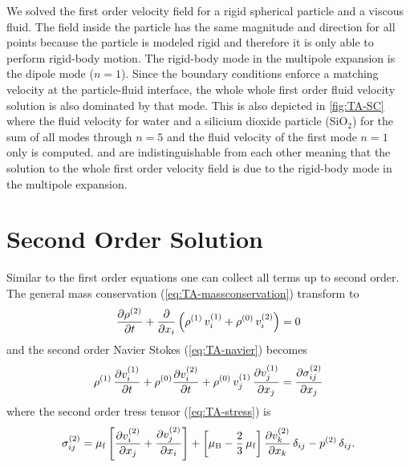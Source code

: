 We solved the first order velocity field for a rigid spherical particle and a 
viscous fluid. The field inside the particle has the same magnitude and 
direction for all points because the particle is modeled rigid and therefore it 
is only able to perform rigid-body motion. The rigid-body mode in the multipole 
expansion is the dipole mode ($n=1$). Since the boundary conditions enforce a 
matching velocity at the particle-fluid interface, the whole whole first order 
fluid velocity solution is also dominated by that mode. This is also depicted 
in \cref{fig:TA-SC} where the fluid velocity for water and a silicium dioxide 
particle (SiO$_{2}$) for the sum of all modes through $n=5$ and the fluid 
velocity of the first mode $n=1$ only is computed.  and 
 are indistinguishable from each other meaning that the 
solution to the whole first order velocity field is due to the rigid-body mode 
in the multipole expansion.

\section{Second Order Solution\label{sec:TA-secondorder}}

Similar to the first order equations one can collect all terms up to second 
order. The general mass conservation (\cref{eq:TA-massconservation}) transform 
to
\begin{equation}
  \pdv{  \rho^{(2)}  }{t} + \pdv{x_{i}}\left(\rho^{(1)}\,v_{i}^{(1)} 
  + \rho^{(0)}\,v_{i}^{(2)} \right) = 0
  \label{eq:TA-nd-massconservatio}
\end{equation}
and the second order Navier Stokes (\cref{eq:TA-navier}) becomes
\begin{equation}
  \rho^{(1)}\,\pdv{  v_{i}^{(1)}  }{t} + \rho^{(0)} 
  \pdv{  v_{i}^{(2)}  }{t} + 
  \rho^{(0)}\,v_{j}^{(1)}\,\pdv{  v_{j}^{(1)}  }{x_{j}} = 
  \pdv{  \sigma_{ij}^{(2)}  }{x_{j}}
  \label{eq:TA-nd-navier}
\end{equation}
where the second order tress tensor (\cref{eq:TA-stress}) is
\begin{equation}
  \sigma_{ij}^{(2)} = \mu_{\mathrm{f}}\left[ \pdv{  v_{i}^{(2)}  }{x_{j}} + 
  \pdv{  v_{j}^{(2)}  }{x_{i}} \right] + \left[ \mu_{\mathrm{B}} - 
  \frac{2}{3}\,\mu_{\mathrm{f}} \right] \pdv{  v_{k}^{(2)}  }{x_{k}} \,\delta_{ij} - 
  p^{(2)}\,\delta_{ij}.
  \label{eq:TA-nd-stress}
\end{equation}

